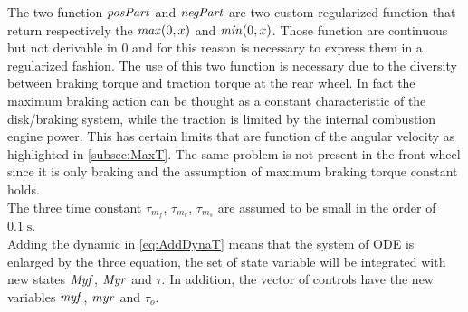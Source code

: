 The two function ${\it posPart}$ and ${\it negPart}$ are two custom regularized function that return respectively the ${\it max}(0,x)$ and ${\it min}(0,x)$. Those function are continuous but not derivable in $0$ and for this reason is necessary to express them in a regularized fashion. 
The use of this two function is necessary due to the diversity between braking torque and traction torque at the rear wheel. In fact the maximum braking action can be thought as a constant characteristic of the disk/braking system, while the traction is limited by the internal combustion engine power. This has certain limits that are function of the angular velocity as highlighted in \ref{subsec:MaxT}. The same problem is not present in the front wheel since it is only braking and the assumption of maximum braking torque constant holds.\\
The three time constant $\tau_{m_f}$, $\tau_{m_r}$, $\tau_{m_s}$ are assumed to be small in the order of $0.1 \; \si{\second}$.\\
Adding the dynamic in \ref{eq:AddDynaT} means that the system of ODE is enlarged by the three equation, the set of state variable will be integrated with new states $\it Myf$, $\it Myr$ and $\tau$. In addition, the vector of controls have the new variables ${\it myf}$, ${\it myr}$ and $\tau_o$.
%
